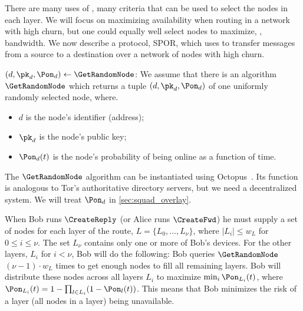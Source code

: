 There are many uses of \Sphinxes, many criteria that can be used to select the 
nodes in each layer.
We will focus on maximizing availability when routing in a network with high 
churn, but one could equally well select nodes to maximize, \eg, bandwidth.
We now describe a protocol, \ac{SPOR}, which uses \Sphinxes to transfer messages 
from a source to a destination over a network of nodes with high churn.

\((d, \pk_d, \Pon_d)\gets \GetRandomNode\): We assume that there is an 
algorithm \(\GetRandomNode\) which returns a tuple \((d, \pk_d, \Pon_d)\) of 
one uniformly randomly selected node, where.
\begin{itemize}
  \item \(d\) is the node's identifier (address);
  \item \(\pk_d\) is the node's public key;
  \item \(\Pon_d(t)\) is the node's probability of being online as a function 
    of time.
\end{itemize}
The \(\GetRandomNode\) algorithm can be instantiated using \eg
Octopus~\cite{Octopus}. Its function is analogous to 
Tor's authoritative directory servers, but we need a decentralized system. 
We will treat \(\Pon_d\) in \cref{sec:squad_overlay}.

When Bob runs \(\CreateReply\) (or Alice runs \(\CreateFwd\)) he must supply a 
set of nodes for each layer of the route, \(L = \{L_0, \dotsc, L_\nu\}\), where 
\(|L_i| \leq w_L\) for \(0\leq i\leq \nu\).
The set \(L_\nu\) contains only one or more of Bob's devices.
For the other layers, \(L_i\) for \(i < \nu\), Bob will do the following:
Bob queries \(\GetRandomNode\) \((\nu-1)\cdot w_L\) times to get enough nodes 
to fill all remaining layers.
Bob will distribute these nodes across all layers \(L_i\) to maximize \(\min_i 
  \Pon_{L_i}(t)\), where \(\Pon_{L_i}(t) = 1-\prod_{l\in L_i} 
  (1-\Pon_l(t))\).
This means that Bob minimizes the risk of a layer (\ie all nodes in a layer) 
being unavailable.

